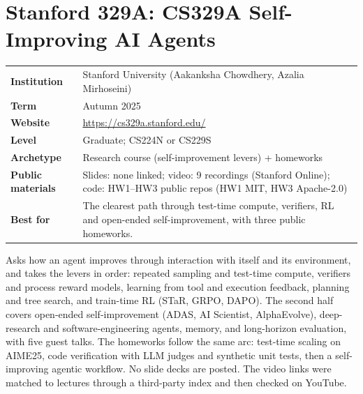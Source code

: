 \documentclass[10pt,oneside]{report}
\begin{document}
\chapter{Stanford 329A: CS329A Self-Improving AI Agents}\hypertarget{course-S329A}{}
{\small\begin{tabularx}{\linewidth}{@{}>{\bfseries}l X@{}}\toprule
Institution & Stanford University (Aakanksha Chowdhery, Azalia Mirhoseini)\\
Term & Autumn 2025\\
Website & \href{https://cs329a.stanford.edu/}{https://cs329a.stanford.edu/}\\
Level & Graduate; CS224N or CS229S\\
Archetype & Research course (self-improvement levers) + homeworks\\
Public materials & Slides: none linked; video: 9 recordings (Stanford Online); code: HW1--HW3 public repos (HW1 MIT, HW3 Apache-2.0)\\
Best for & The clearest path through test-time compute, verifiers, RL and open-ended self-improvement, with three public homeworks.\\
\bottomrule\end{tabularx}}

Asks how an agent improves through interaction with itself and its environment, and takes the levers in order: repeated sampling and test-time compute, verifiers and process reward models, learning from tool and execution feedback, planning and tree search, and train-time RL (STaR, GRPO, DAPO).
The second half covers open-ended self-improvement (ADAS, AI Scientist, AlphaEvolve), deep-research and software-engineering agents, memory, and long-horizon evaluation, with five guest talks.
The homeworks follow the same arc: test-time scaling on AIME25, code verification with LLM judges and synthetic unit tests, then a self-improving agentic workflow.
No slide decks are posted. The video links were matched to lectures through a third-party index and then checked on YouTube.
\end{document}
